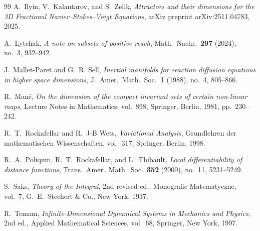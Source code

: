 \documentclass[12pt,a4paper]{article}
\theoremstyle{definition}
\theoremstyle{plain}
\theoremstyle{remark}
\begin{document}
\begin{thebibliography}{99}
A.~Ilyin, V.~Kalantarov, and S.~Zelik,
\emph{Attractors and their dimensions for the 3D Fractional
Navier--Stokes--Voigt Equations},
arXiv preprint arXiv:2511.04783, 2025.

A.~Lytchak,
\emph{A note on subsets of positive reach},
Math.\ Nachr.\ \textbf{297} (2024), no.~3, 932--942.

J.~Mallet-Paret and G.~R. Sell,
\emph{Inertial manifolds for reaction diffusion equations in higher
space dimensions},
J.~Amer.\ Math.\ Soc.\ \textbf{1} (1988), no.~4, 805--866.

R.~Man\'e,
\emph{On the dimension of the compact invariant sets of certain
non-linear maps},
Lecture Notes in Mathematics, vol.~898, Springer, Berlin, 1981,
pp.~230--242.

R.~T.~Rockafellar and R.~J-B Wets,
\emph{Variational Analysis},
Grundlehren der mathematischen Wissenschaften, vol.~317,
Springer, Berlin, 1998.

R.~A.~Poliquin, R.~T.~Rockafellar, and L.~Thibault,
\emph{Local differentiability of distance functions},
Trans.\ Amer.\ Math.\ Soc.\ \textbf{352} (2000), no.~11, 5231--5249.

S.~Saks,
\emph{Theory of the Integral},
2nd revised ed., Monografie Matematyczne, vol.~7,
G.~E.~Stechert \& Co., New York, 1937.

R.~Temam,
\emph{Infinite-Dimensional Dynamical Systems in Mechanics and Physics},
2nd ed., Applied Mathematical Sciences, vol.~68,
Springer, New York, 1997.

\end{thebibliography}
\end{document}
